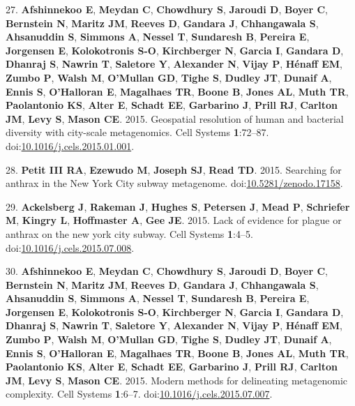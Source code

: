 \documentclass[11pt,]{article}
\begin{document}
\hypertarget{ref-Afshinnekoo2015a}{}
27. \textbf{Afshinnekoo E}, \textbf{Meydan C}, \textbf{Chowdhury S},
\textbf{Jaroudi D}, \textbf{Boyer C}, \textbf{Bernstein N},
\textbf{Maritz JM}, \textbf{Reeves D}, \textbf{Gandara J},
\textbf{Chhangawala S}, \textbf{Ahsanuddin S}, \textbf{Simmons A},
\textbf{Nessel T}, \textbf{Sundaresh B}, \textbf{Pereira E},
\textbf{Jorgensen E}, \textbf{Kolokotronis S-O}, \textbf{Kirchberger N},
\textbf{Garcia I}, \textbf{Gandara D}, \textbf{Dhanraj S},
\textbf{Nawrin T}, \textbf{Saletore Y}, \textbf{Alexander N},
\textbf{Vijay P}, \textbf{Hénaff EM}, \textbf{Zumbo P}, \textbf{Walsh
M}, \textbf{O'Mullan GD}, \textbf{Tighe S}, \textbf{Dudley JT},
\textbf{Dunaif A}, \textbf{Ennis S}, \textbf{O'Halloran E},
\textbf{Magalhaes TR}, \textbf{Boone B}, \textbf{Jones AL}, \textbf{Muth
TR}, \textbf{Paolantonio KS}, \textbf{Alter E}, \textbf{Schadt EE},
\textbf{Garbarino J}, \textbf{Prill RJ}, \textbf{Carlton JM},
\textbf{Levy S}, \textbf{Mason CE}. 2015. Geospatial resolution of human
and bacterial diversity with city-scale metagenomics. Cell Systems
\textbf{1}:72--87.
doi:\href{https://doi.org/10.1016/j.cels.2015.01.001}{10.1016/j.cels.2015.01.001}.

\hypertarget{ref-Petit2015}{}
28. \textbf{Petit III RA}, \textbf{Ezewudo M}, \textbf{Joseph SJ},
\textbf{Read TD}. 2015. Searching for anthrax in the New York City
subway metagenome.
doi:\href{https://doi.org/10.5281/zenodo.17158}{10.5281/zenodo.17158}.

\hypertarget{ref-Ackelsberg2015}{}
29. \textbf{Ackelsberg J}, \textbf{Rakeman J}, \textbf{Hughes S},
\textbf{Petersen J}, \textbf{Mead P}, \textbf{Schriefer M},
\textbf{Kingry L}, \textbf{Hoffmaster A}, \textbf{Gee JE}. 2015. Lack of
evidence for plague or anthrax on the new york city subway. Cell Systems
\textbf{1}:4--5.
doi:\href{https://doi.org/10.1016/j.cels.2015.07.008}{10.1016/j.cels.2015.07.008}.

\hypertarget{ref-Afshinnekoo2015b}{}
30. \textbf{Afshinnekoo E}, \textbf{Meydan C}, \textbf{Chowdhury S},
\textbf{Jaroudi D}, \textbf{Boyer C}, \textbf{Bernstein N},
\textbf{Maritz JM}, \textbf{Reeves D}, \textbf{Gandara J},
\textbf{Chhangawala S}, \textbf{Ahsanuddin S}, \textbf{Simmons A},
\textbf{Nessel T}, \textbf{Sundaresh B}, \textbf{Pereira E},
\textbf{Jorgensen E}, \textbf{Kolokotronis S-O}, \textbf{Kirchberger N},
\textbf{Garcia I}, \textbf{Gandara D}, \textbf{Dhanraj S},
\textbf{Nawrin T}, \textbf{Saletore Y}, \textbf{Alexander N},
\textbf{Vijay P}, \textbf{Hénaff EM}, \textbf{Zumbo P}, \textbf{Walsh
M}, \textbf{O'Mullan GD}, \textbf{Tighe S}, \textbf{Dudley JT},
\textbf{Dunaif A}, \textbf{Ennis S}, \textbf{O'Halloran E},
\textbf{Magalhaes TR}, \textbf{Boone B}, \textbf{Jones AL}, \textbf{Muth
TR}, \textbf{Paolantonio KS}, \textbf{Alter E}, \textbf{Schadt EE},
\textbf{Garbarino J}, \textbf{Prill RJ}, \textbf{Carlton JM},
\textbf{Levy S}, \textbf{Mason CE}. 2015. Modern methods for delineating
metagenomic complexity. Cell Systems \textbf{1}:6--7.
doi:\href{https://doi.org/10.1016/j.cels.2015.07.007}{10.1016/j.cels.2015.07.007}.
\end{document}
